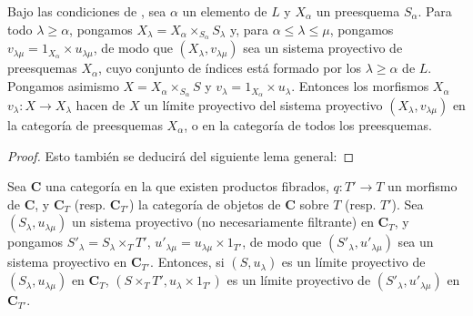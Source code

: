 \begin{proposition}[8.2.5]
\label{IV.8.2.5-fr}
Bajo las condiciones de , sea $\alpha$ un elemento de $L$ y $X_\alpha$ un preesquema $S_\alpha$.
Para todo $\lambda\geq\alpha$, pongamos $X_\lambda=X_\alpha\times_{S_\alpha}S_\lambda$ y, para $\alpha\leq\lambda\leq\mu$, pongamos $v_{\lambda\mu}=1_{X_\alpha}\times u_{\lambda\mu}$, de modo que $(X_\lambda,v_{\lambda\mu})$ sea un sistema proyectivo de preesquemas $X_\alpha$, cuyo conjunto de índices está formado por los $\lambda\geq\alpha$ de $L$.
Pongamos asimismo $X=X_\alpha\times_{S_\alpha}S$ y $v_\lambda=1_{X_\alpha}\times u_\lambda$.
Entonces los morfismos $X_\alpha$ $v_\lambda:X\to X_\lambda$ hacen de $X$ un límite proyectivo del sistema proyectivo $(X_\lambda,v_{\lambda\mu})$ en la categoría de preesquemas $X_\alpha$, o en la categoría de todos los preesquemas.
\end{proposition}

\begin{proof}
Esto también se deducirá del siguiente lema general:
\end{proof}

\begin{lemma}[8.2.6]
\label{IV.8.2.6-fr}
Sea $\boldsymbol{C}$ una categoría en la que existen productos fibrados, $q:T'\to T$ un morfismo de $\boldsymbol{C}$, y $\boldsymbol{C}_T$ (\textup{resp.} $\boldsymbol{C}_{T'}$) la categoría de objetos de $\boldsymbol{C}$ sobre
$T$ \textup{(resp. $T'$)}.
Sea $(S_\lambda,u_{\lambda\mu})$ un sistema proyectivo (no necesariamente filtrante) en $\boldsymbol{C}_T$, y pongamos $S'_\lambda=S_\lambda\times_T T'$, $u'_{\lambda\mu}=u_{\lambda\mu}\times 1_{T'}$, de modo que $(S'_\lambda,u'_{\lambda\mu})$ sea un sistema proyectivo en $\boldsymbol{C}_{T'}$.
Entonces, si $(S,u_\lambda)$ es un límite proyectivo de $(S_\lambda,u_{\lambda\mu})$ en $\boldsymbol{C}_T$, $(S\times_T T',u_\lambda\times 1_{T'})$ es un límite proyectivo de $(S'_\lambda,u'_{\lambda\mu})$ en $\boldsymbol{C}_{T'}$.
\end{lemma}

